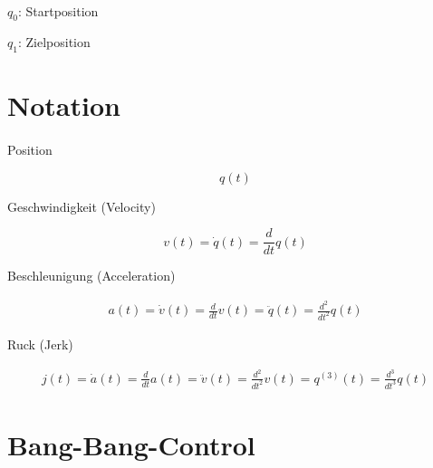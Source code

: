 \STANDARD{\insertsection}
{ 
  \framesubtitle{\insertsubsection}

  $q_0$: Startposition

  $q_1$: Zielposition

  \begin{figure}[!h]
    \centering
    
  \end{figure}
}

\section{Notation}
\STANDARD{\insertsection}
{ 
  \framesubtitle{\insertsubsection}

  Position

  \begin{equation}
    q(t)
  \end{equation}

  Geschwindigkeit (Velocity)

  \begin{equation}
    v(t) 
    = \dot{q}(t) 
    = \frac{d}{dt} q(t)
  \end{equation}

  Beschleunigung (Acceleration)

  \begin{eqnarray}
    a(t) 
    = \dot{v}(t) = \frac{d}{dt} v(t) 
    = \ddot{q}(t) = \frac{d^2}{dt^2} q(t)
  \end{eqnarray}

  Ruck (Jerk)

  \begin{eqnarray}
    j(t) 
    = \dot{a}(t) = \frac{d}{dt} a(t)
    = \ddot{v}(t) = \frac{d^2}{dt^2} v(t)
    = q^{(3)}(t) = \frac{d^3}{dt^3} q(t)
  \end{eqnarray}
}


\section{Bang-Bang-Control}

